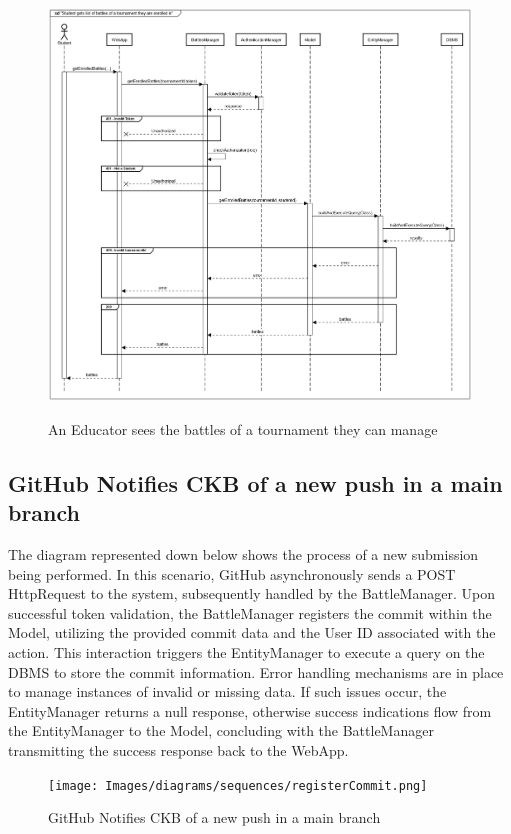 \documentclass{Configuration_Files/Template}
\begin{document}
\begin{figure}[H]
\centering
\includegraphics[scale = 0.33]{Images/diagrams/sequences/getCreatedBattles.png}\\
\caption{An Educator sees the battles of a tournament they can manage}
\end{figure}

\subsection{GitHub Notifies CKB of a new push in a main branch}

The diagram represented down below shows the process of a new submission being performed. In this scenario, GitHub asynchronously sends a POST HttpRequest to the system, subsequently handled by the BattleManager. Upon successful token validation, the BattleManager registers the commit within the Model, utilizing the provided commit data and the User ID associated with the action. This interaction triggers the EntityManager to execute a query on the DBMS to store the commit information. Error handling mechanisms are in place to manage instances of invalid or missing data. If such issues occur, the EntityManager returns a null response, otherwise success indications flow from the EntityManager to the Model, concluding with the BattleManager transmitting the success response back to the WebApp. 

\begin{figure}[H]
\centering
\texttt{[image: Images/diagrams/sequences/registerCommit.png]}\\
\caption{GitHub Notifies CKB of a new push in a main branch}
\end{figure}
\end{document}

